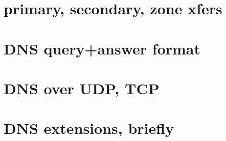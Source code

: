\section{primary, secondary, zone xfers}

\section{DNS query+answer format}


\section{DNS over UDP, TCP}


\section{DNS extensions, briefly}

